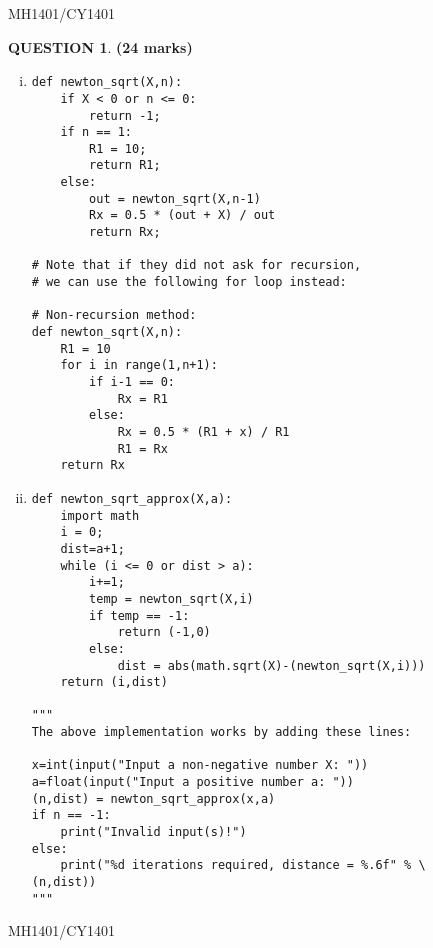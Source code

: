 \documentclass[a4paper,12pt]{article}
\theoremstyle{definition}
\newtheorem{ques}[dummy]{QUESTION}
\theoremstyle{plain}
\newcommand{\py}{python}
\begin{document}
\newpage
\hfill MH1401/CY1401\vspace*{0.5em}
\begin{ques}\hfill \textbf{(24 marks)}\vspace*{1em}
	\begin{enumerate}[(i)]
		\item
		\begin{verbatim}
def newton_sqrt(X,n):
    if X < 0 or n <= 0:
        return -1;
    if n == 1:
        R1 = 10;
        return R1;
    else:
        out = newton_sqrt(X,n-1)
        Rx = 0.5 * (out + X) / out
        return Rx;		

# Note that if they did not ask for recursion,
# we can use the following for loop instead:

# Non-recursion method:
def newton_sqrt(X,n):
    R1 = 10
    for i in range(1,n+1):
        if i-1 == 0:
            Rx = R1
        else:
            Rx = 0.5 * (R1 + x) / R1
            R1 = Rx
    return Rx
\end{verbatim}
\item
		\begin{verbatim}
def newton_sqrt_approx(X,a):
    import math
    i = 0;
    dist=a+1;
    while (i <= 0 or dist > a):
        i+=1;
        temp = newton_sqrt(X,i)
        if temp == -1:
            return (-1,0)
        else:
            dist = abs(math.sqrt(X)-(newton_sqrt(X,i)))
    return (i,dist)
    
"""
The above implementation works by adding these lines:

x=int(input("Input a non-negative number X: "))
a=float(input("Input a positive number a: "))
(n,dist) = newton_sqrt_approx(x,a)
if n == -1:
    print("Invalid input(s)!")
else:
    print("%d iterations required, distance = %.6f" % \ 
(n,dist))
"""
		\end{verbatim}
	\end{enumerate}
\end{ques}



\newpage

\hfill MH1401/CY1401\vspace*{0.5em}
\end{document}
